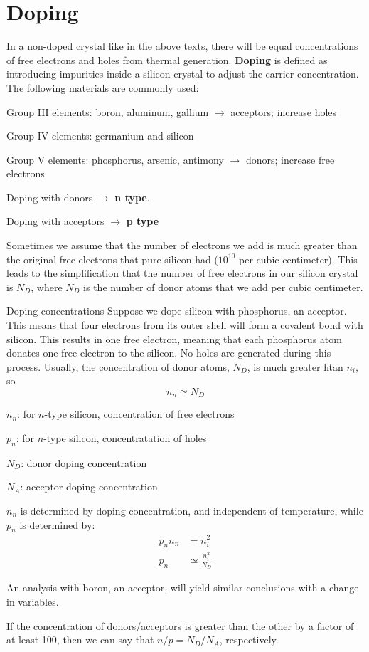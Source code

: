 \section{Doping}
In a non-doped crystal like in the above texts, there will be equal concentrations of free electrons and holes from thermal generation. \textbf{Doping} is defined as introducing impurities inside a silicon crystal to adjust the carrier concentration. The following materials are commonly used:
\begin{pline}
    \item Group III elements: boron, aluminum, gallium $\rightarrow$ acceptors; increase holes
    \item Group IV elements: germanium and silicon
    \item Group V elements: phosphorus, arsenic, antimony $\rightarrow$ donors; increase free electrons
\end{pline}
Doping with donors $\rightarrow$ \textbf{n type}.

Doping with acceptors $\rightarrow$ \textbf{p type}

Sometimes we assume that the number of electrons we add is much greater than the original free electrons that pure silicon had ($10^{10}$ per cubic centimeter). This leads to the simplification that the number of free electrons in our silicon crystal is $N_D$, where $N_D$ is the number of donor atoms that we add per cubic centimeter.

\begin{Analysis}{Doping concentrations}{}
Suppose we dope silicon with phosphorus, an acceptor. This means that four electrons from its outer shell will form a covalent bond with silicon. This results in one free electron, meaning that each phosphorus atom donates one free electron to the silicon. No holes are generated during this process. Usually, the concentration of donor atoms, $N_D$, is much greater htan $n_i$, so 
    \[n_n \simeq N_D\]
\begin{gline}
    \item $n_n$: for $n$-type silicon, concentration of free electrons
    \item $p_n$: for $n$-type silicon, concentratation of holes
    \item $N_D$: donor doping concentration
    \item $N_A$: acceptor doping concentration
\end{gline}
$n_n$ is determined by doping concentration, and independent of temperature,  while $p_n$ is determined by:
    \begin{align*}
        p_n n_n &= n_i^2 \\
        p_n &\simeq \frac{n_i^2}{N_D}
    \end{align*}

An analysis with boron, an acceptor, will yield similar conclusions with a change in variables.

If the concentration of donors/acceptors is greater than the other by a factor of at least 100, then we can say that $n/p = N_D / N_A$, respectively.
\end{Analysis}

